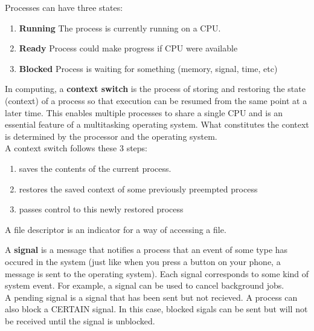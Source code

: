 \documentclass[15pt,idxtotoc,hyperref,openany]{labbook} %
\begin{document}
Processes can have three states:
\begin{enumerate}
\item  {\bf Running}  The process is currently running on a CPU.
\item {\bf Ready} Process could make progress if CPU were available
\item  {\bf Blocked} Process is waiting for something (memory, signal, time, etc)
\end{enumerate}




In computing, a {\bf context switch} is the process of storing and restoring the state (context) of a process so that execution can be resumed from the same point at a later time. This enables multiple processes to share a single CPU and is an essential feature of a multitasking operating system. What constitutes the context is determined by the processor and the operating system.\\

A context switch follows these 3 steps:

\begin{enumerate}
\item   saves the contents of the current process.
\item  restores the saved context of some previously preempted process
\item  passes control to this newly restored process
\end{enumerate}



A file descriptor is an indicator for a way of accessing a file.


A {\bf signal} is a message that notifies a process that an event of some type has occured in the system (just like when you press a button on your phone, a message is sent to the operating system).  Each signal corresponds to some kind of system event.  For example, a signal can be used to cancel background jobs.\\


A pending signal is a signal that has been sent but not recieved.  A process can also block a CERTAIN signal.  In this case, blocked sigals can be sent
but will not be received until the signal is unblocked.
\end{document}
